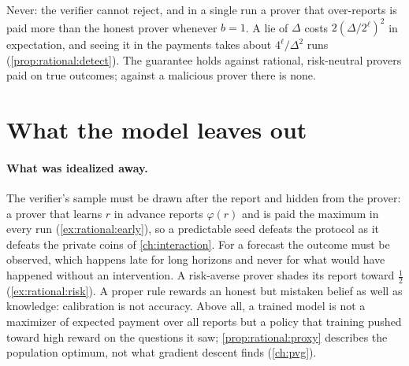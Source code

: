 \begin{refsection}
\questionthree Never: the verifier cannot reject, and in a single run a prover that over-reports is paid more than the honest prover whenever $b=1$. A lie of $\Delta$ costs $2(\Delta/2^\ell)^2$ in expectation, and seeing it in the payments takes about $4^\ell/\Delta^2$ runs (\cref{prop:rational:detect}). The guarantee holds against rational, risk-neutral provers paid on true outcomes; against a malicious prover there is none.

\noindent\begin{minipage}{\linewidth}
\end{minipage}

\section{What the model leaves out}\label{sec:rational:leaves}

\paragraph{What was idealized away.} The verifier's sample must be drawn after the report and hidden from the prover: a prover that learns $r$ in advance reports $\varphi(r)$ and is paid the maximum in every run (\cref{ex:rational:early}), so a predictable seed defeats the protocol as it defeats the private coins of \cref{ch:interaction}. For a forecast the outcome must be observed, which happens late for long horizons and never for what would have happened without an intervention. A risk-averse prover shades its report toward $\frac12$ (\cref{ex:rational:risk}). A proper rule rewards an honest but mistaken belief as well as knowledge: calibration is not accuracy. Above all, a trained model is not a maximizer of expected payment over all reports but a policy that training pushed toward high reward on the questions it saw; \cref{prop:rational:proxy} describes the population optimum, not what gradient descent finds (\cref{ch:pvg}).


\end{refsection}
